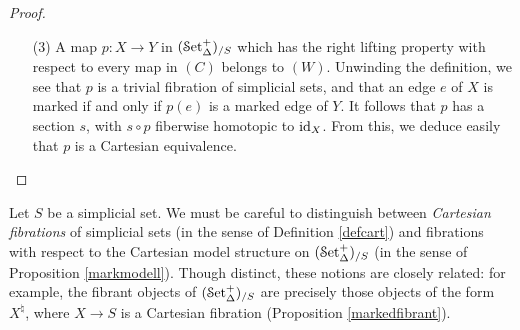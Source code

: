 \begin{proof}
\begin{itemize}
\item[(3)] A map $p: X \rightarrow Y$ in $(\operatorname{\mathcal{S}et_{\Delta}^{+}})_{/S}$ which has the right lifting property with
respect to every map in $(C)$ belongs to $(W)$. Unwinding the definition, we see that
$p$ is a trivial fibration of simplicial sets, and that an edge $e$ of $X$ is marked if and only if
$p(e)$ is a marked edge of $Y$. It follows that $p$ has a section $s$, with $s \circ p$ fiberwise homotopic to $\operatorname{id}_{X}$. From this, we deduce easily that $p$ is a Cartesian equivalence.

\end{itemize}

\end{proof}

\begin{warning}
Let $S$ be a simplicial set. We must be careful to distinguish between
{\it Cartesian fibrations} of simplicial sets (in the sense of Definition \ref{defcart}) and
fibrations with respect to the Cartesian model structure on $(\operatorname{\mathcal{S}et_{\Delta}^{+}})_{/S}$ (in the sense of
Proposition \ref{markmodell}). Though distinct, these notions are closely related: for example, the fibrant objects of $(\operatorname{\mathcal{S}et_{\Delta}^{+}})_{/S}$ are precisely those objects of the form $X^{\natural}$, where
$X \rightarrow S$ is a Cartesian fibration (Proposition \ref{markedfibrant}).
\end{warning}

